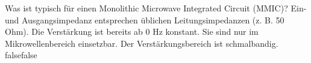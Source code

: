     {Was ist typisch für einen Monolithic Microwave Integrated Circuit (MMIC)?}
    {Ein- und Ausgangsimpedanz entsprechen üblichen Leitungsimpedanzen (z. B. 50 Ohm).}
    {Die Verstärkung ist bereits ab 0 Hz konstant.}
    {Sie sind nur im Mikrowellenbereich einsetzbar.}
    {Der Verstärkungsbereich ist schmalbandig.}
    {false}{false}